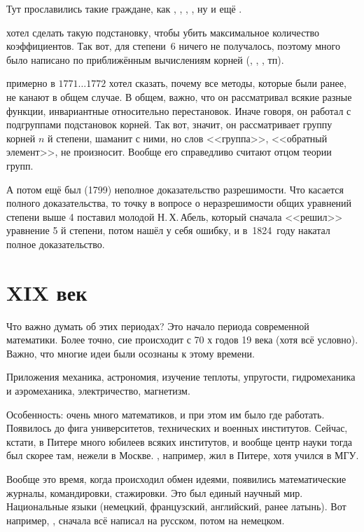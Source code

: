 \documentclass[a4paper,oneside,fleqn,10pt]{article}
\newcommand{\pe}[2]{${#1}\ldots{#2}$}
\begin{document}
Тут прославились такие граждане, как , ,
, , ну и ещё .

 хотел сделать такую подстановку, чтобы убить
максимальное количество коэффициентов.  Так вот, для степени~6 ничего
не получалось, поэтому много было написано по приближённым вычислениям
корней (, , , тп).

 примерно в \pe{1771}{1772} хотел сказать, почему все
методы, которые были ранее, не канают в общем случае. В общем, важно,
что он рассматривал всякие разные функции, инвариантные относительно
перестановок. Иначе говоря, он работал с подгруппами подстановок
корней.  Так вот, значит, он рассматривает группу корней $n$ й
степени, шаманит с ними, но слов <<группа>>, <<обратный элемент>>, не
произносит.  Вообще его справедливо считают отцом теории групп.

А потом ещё был  (1799) неполное доказательство
разрешимости.  Что касается полного доказательства, то точку в вопросе
о неразрешимости общих уравнений степени выше 4 поставил молодой
Н.\,Х.\,Абель, который сначала <<решил>> уравнение 5 й степени, потом
нашёл у себя ошибку, и в~1824~году накатал полное доказательство.



\section{XIX век}

Что важно думать об этих периодах? Это начало периода современной
математики.  Более точно, сие происходит с 70 х годов 19 века (хотя
всё условно).  Важно, что многие идеи были осознаны к этому времени.

Приложения механика, астрономия, изучение теплоты, упругости,
гидромеханика и аэромеханика, электричество, магнетизм.

Особенность: очень много математиков, и при этом им было где
работать. Появилось до фига университетов, технических и военных
институтов. Сейчас, кстати, в Питере много юбилеев всяких институтов,
и вообще центр науки тогда был скорее там, нежели в Москве.
, например, жил в Питере, хотя учился в МГУ.

Вообще это время, когда происходил обмен идеями, появились
математические журналы, командировки, стажировки. Это был единый
научный мир. Национальные языки (немецкий, французский, английский,
ранее латынь). Вот например, , сначала всё написал
на русском, потом на немецком.
\end{document}
